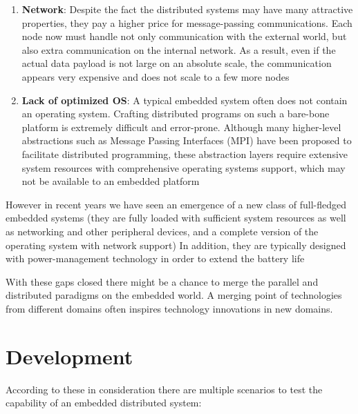 \begin{enumerate}
    \item \textbf{Network}: Despite the fact the distributed systems may have
    many attractive properties, they pay a higher price for message-passing 
    communications. Each node now must handle not only communication with 
    the external world, but also extra communication on the internal network. 
    As a result, even if the actual data payload is not large on an absolute 
    scale, the communication appears very expensive and does not scale to a few
    more nodes

    \item \textbf{Lack of optimized OS}: A typical embedded system often does
    not contain an operating system. Crafting distributed programs on such a
    bare-bone platform is extremely difficult and error-prone. Although many
    higher-level abstractions such as Message Passing Interfaces (MPI) have been
    proposed to facilitate distributed programming, these abstraction layers require
    extensive system resources with comprehensive operating systems support, which
    may not be available to an embedded platform 
    
\end{enumerate}
 
However in recent years we have seen an emergence of a new class of full-fledged
embedded systems (they are fully loaded with sufficient system resources as well
as networking and other peripheral devices, and a complete version of the
operating system with network support) In addition, they are typically designed
with power-management technology in order to extend the battery life

With these gaps closed there might be a chance to merge the parallel and
distributed paradigms on the embedded world.  A merging point of technologies
from different domains often inspires technology innovations in new domains.

\section{Development}

According to these in consideration there are multiple scenarios to test the
capability of an embedded distributed system: 


